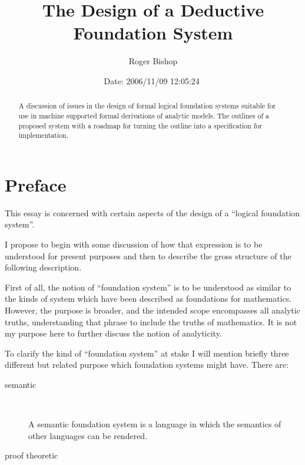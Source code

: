 \documentclass[numreferences]{rbjk}
\begin{document}
                                                                                   
\begin{article}
\begin{opening}  
\title{The Design of a Deductive Foundation System}
\author{Roger Bishop }
\date{$ $Date: 2006/11/09 12:05:24 $ $}

\begin{abstract}
A discussion of issues in the design of formal logical foundation systems suitable for use in machine supported formal derivations of analytic models.
The outlines of a proposed system with a roadmap for turning the outline into a specification for implementation. 
\end{abstract}
\end{opening}

\setcounter{tocdepth}{4}
{\parskip-0pt\tableofcontents}

\section{Preface}

This essay is concerned with certain aspects of the design of a ``logical foundation system''.

I propose to begin with some discussion of how that expression is to be understood for present purposes and then to describe the gross structure of the following description.

First of all, the notion of ``foundation system'' is to be understood as similar to the kinds of system which have been described as foundations for mathematics.
However, the purpose is broader, and the intended scope encompasses all analytic truths, understanding that phrase to include the truths of mathematics.
It is not my purpose here to further discuss the notion of analyticity.

To clarify the kind of ``foundation system'' at stake I will mention briefly three different but related purpose which foundation systems might have.
There are:

\begin{description}
\item[semantic]\ 

A semantic foundation system is a language in which the semantics of other languages can be rendered.

\item[proof theoretic]\ 


\end{description}
\end{article}
\end{document}

